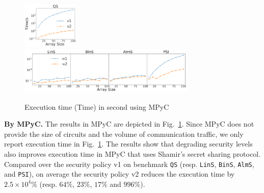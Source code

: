 \begin{figure}[t]
    \centering
    \includegraphics[width=0.24\textwidth]{img/ss100Left}
    \includegraphics[width=0.7515\textwidth]{img/ss100Right}
   \vspace{-5mm} \caption{Execution time (Time) in second using MPyC}
    \label{fig:ss}  \vspace{-4mm}
\end{figure}

\smallskip
\noindent
{\bf By MPyC.} The results in MPyC are depicted in Fig.~\ref{fig:ss}.
Since  MPyC does not provide the size of circuits and the volume of communication traffic, we only report
execution time in Fig.~\ref{fig:ss}.
The results show that degrading security levels also improves execution time
in MPyC that uses Shamir's secret sharing protocol.
Compared over the security policy v1 on benchmark {\tt QS} (resp. {\tt LinS}, {\tt BinS}, {\tt AlmS}, and {\tt PSI}), on average the security policy v2 reduces the execution time by $2.5\times 10^4\%$ (resp. $64\%$, $23\%$, $17\%$ and $996\%$).


